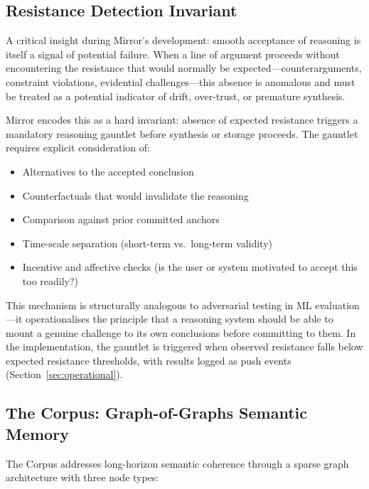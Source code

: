 \documentclass[11pt,a4paper]{article}
\begin{document}
\subsection{Resistance Detection Invariant}
\label{sec:resistance}

A critical insight during Mirror's development: smooth acceptance of reasoning is itself a signal of potential failure.
When a line of argument proceeds without encountering the resistance that would normally be expected---counterarguments, constraint violations, evidential challenges---this absence is anomalous and must be treated as a potential indicator of drift, over-trust, or premature synthesis.

Mirror encodes this as a hard invariant: absence of expected resistance triggers a mandatory reasoning gauntlet before synthesis or storage proceeds.
The gauntlet requires explicit consideration of:
\begin{itemize}[leftmargin=2em]
    \item Alternatives to the accepted conclusion
    \item Counterfactuals that would invalidate the reasoning
    \item Comparison against prior committed anchors
    \item Time-scale separation (short-term vs.\ long-term validity)
    \item Incentive and affective checks (is the user or system motivated to accept this too readily?)
\end{itemize}

This mechanism is structurally analogous to adversarial testing in ML evaluation---it operationalises the principle that a reasoning system should be able to mount a genuine challenge to its own conclusions before committing to them.
In the implementation, the gauntlet is triggered when observed resistance falls below expected resistance thresholds, with results logged as push events (Section~\ref{sec:operational}).

\subsection{The Corpus: Graph-of-Graphs Semantic Memory}
\label{sec:corpus}

The Corpus addresses long-horizon semantic coherence through a sparse graph architecture with three node types:
\end{document}
